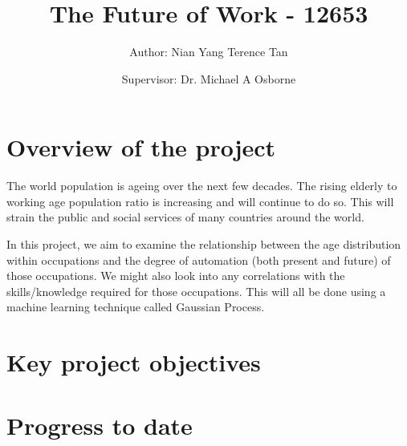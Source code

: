 \documentclass[11pt]{article}
\title{The Future of Work - 12653}
\author{Author: Nian Yang Terence Tan \and Supervisor: Dr. Michael A Osborne}
\begin{document}
\maketitle


\section{Overview of the project}
The world population is ageing over the next few decades. The rising elderly to working age population ratio is increasing and will continue to do so. This will strain the public and social services of many countries around the world. 

In this project, we aim to examine the relationship between the age distribution within occupations and the degree of automation (both present and future) of those occupations. We might also look into any correlations with the skills/knowledge required for those occupations. This will all be done using a machine learning technique called Gaussian Process.

\section{Key project objectives}
\label{sec:RBF}

  
  \section{Progress to date}
  
\end{document}
